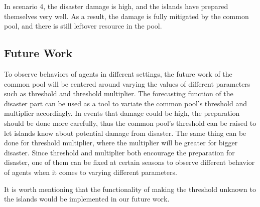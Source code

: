 In scenario 4, the disaster damage is high, and the islands have prepared themselves very well. As a result, the damage is fully mitigated by the common pool, and there is still leftover resource in the pool. 


\subsection{Future Work}

To observe behaviors of agents in different settings, the future work of the common pool will be centered around varying the values of different parameters such as threshold and threshold multiplier. The forecasting function of the disaster part can be used as a tool to variate the common pool’s threshold and multiplier accordingly. In events that damage could be high, the preparation should be done more carefully, thus the common pool’s threshold can be raised to let islands know about potential damage from disaster. The same thing can be done for threshold multiplier, where the multiplier will be greater for bigger disaster. Since threshold and multiplier both encourage the preparation for disaster, one of them can be fixed at certain seasons to observe different behavior of agents when it comes to varying different parameters. 

It is worth mentioning that the functionality of making the threshold unknown to the islands would be implemented in our future work.